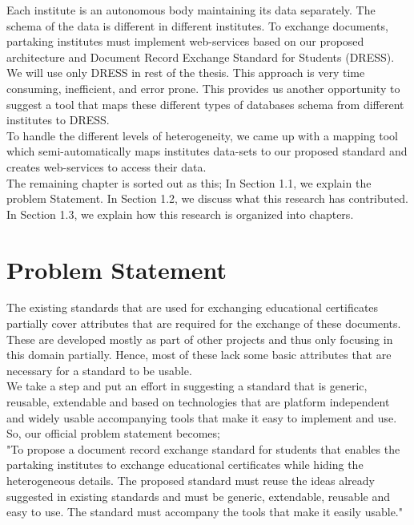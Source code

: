 \documentclass[12pt,a4paper,oneside]{book}
\begin{document}
Each institute is an autonomous body maintaining its data separately. The schema of the data is different in different institutes. To exchange documents, partaking institutes must implement web-services based on our proposed architecture and Document Record Exchange Standard for Students (DRESS). We will use only DRESS in rest of the thesis. This approach is very time consuming, inefficient, and error prone. This provides us another  opportunity to suggest a tool that maps these different types of databases schema from different institutes to DRESS. \\

To handle the different levels of heterogeneity, we came up with a mapping tool which semi-automatically maps institutes data-sets to our proposed standard and creates web-services to access their data. \\

The remaining chapter is sorted out as this; In Section 1.1, we explain the problem Statement. In Section 1.2, we discuss what this research has contributed. In Section 1.3, we explain how this research is organized into chapters.

\section{Problem Statement}\label{s-problem_statement}

The existing standards that are used for exchanging educational certificates partially cover attributes that are required for the exchange of these documents. These are developed mostly as part of other projects and thus only focusing in this domain partially. Hence, most of these lack some basic attributes that are necessary for a standard to be usable. \\

We take a step and put an effort in suggesting a standard that is generic, reusable, extendable and based on technologies that are platform independent and widely usable accompanying tools that make it easy to implement and use. So, our official problem statement becomes; \\   

"To propose a document record exchange standard for students that enables the partaking institutes to exchange educational certificates while hiding the heterogeneous details. The proposed standard must reuse the ideas already suggested in existing standards and must be generic, extendable, reusable and easy to use. The standard must accompany the tools that make it easily usable." 
\end{document}
